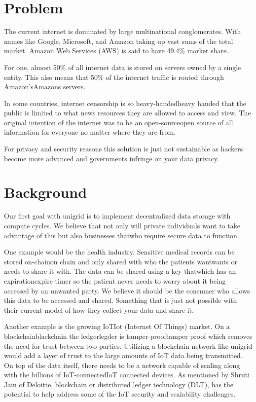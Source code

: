 \documentclass[12pt]{article}
\begin{document}
\newpage
\section*{Problem}

The current internet is dominated by large multinational conglomerates. With names like Google, Microsoft, and Amazon taking up vast sums of the total market. Amazon Web Services (AWS) is said to have 49.4\% market share\cite{jeb2019}.

For one, almost 50\% of all internet data is stored on servers owned by a single entity\cite{jeb2019}. This also means that 50\% of the internet traffic is routed through Amazon’sAmazons servers\cite{jeb2019}.

In some countries, internet censorship is so heavy-handedheavy handed that the public is limited to what news resources they are allowed to access and view\cite{wiki2021}. The original intention of the internet was to be an open-sourceopen source of all information for everyone no matter where they are from.

For privacy and security reasons this solution is just not sustainable as hackers become more advanced and governments infringe on your data privacy.


\section*{Background}
Our first goal with unigrid is to implement decentralized data storage with compute cycles. We believe that not only will private individuals want to take advantage of this but also businesses thatwho require secure data to function.

One example would be the health industry. Sensitive medical records can be stored on-chainon chain and only shared with who the patients wantwants or needs to share it with. The data can be shared using a key thatwhich has an expirationexpire timer so the patient never needs to worry about it being accessed by an unwanted party. We believe it should be the consumer who allows this data to be accessed and shared. Something that is just not possible with their current model of how they collect your data and share it.

Another example is the growing IoTIot (Internet Of Things) market. On a blockchainblackchain the ledgerlegder is tamper-prooftamper proof which removes the need for trust between two parties. Utilizing a blockchain network like unigrid would add a layer of trust to the large amounts of IoT data being transmitted. On top of the data itself, there needs to be a network capable of scaling along with the billions of IoT-connectedIoT connected devices. As mentioned by Shruti Jain of Deloitte\cite{jain2021}, blockchain or distributed ledger technology (DLT), has the potential to help address some of the IoT security and scalability challenges.
\end{document}
